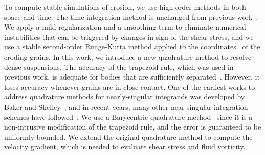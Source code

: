 \documentclass[preprint,10pt]{elsarticle}
\begin{document}
To compute stable simulations of erosion, we use high-order methods in
both space and time. The time integration method is unchanged from
previous work~\cite{qua-moo2018}.  We apply a mild regularization and a
smoothing term to eliminate numerical instabilities that can be triggered by changes in
sign of the shear stress, and we use a stable second-order Runge-Kutta
method applied to the {\thL} coordinates~\cite{hou-low-she1994} of the
eroding grains.  In this work, we introduce a new quadrature method to
resolve dense suspensions.  The accuracy of the
trapezoid rule, which was used in previous work, is adequate for
bodies that are sufficiently separated~\cite{tre-wei2014}.  However, it
loses accuracy whenever grains are in close contact.  One of the
earliest works to address quadrature methods for nearly-singular
integrands was developed by Baker and Shelley~\cite{bak-she1986}, and in
recent years, many other near-singular integration schemes have
followed~\cite{oja-tor2015, kli-tor2018, hel-oja2008a, bea-yin-wil2016,
bea-lai2001, klo-bar-gre-one2013}.  We use a Barycentric quadrature
method~\cite{bar2014, bar-wu-vee2015} since it is a non-intrusive
modification of the trapezoid rule, and the error is guaranteed to be
uniformly bounded.  We extend the original quadrature method to compute
the velocity gradient, which is needed to evaluate shear stress and
fluid vorticity.
\end{document}
